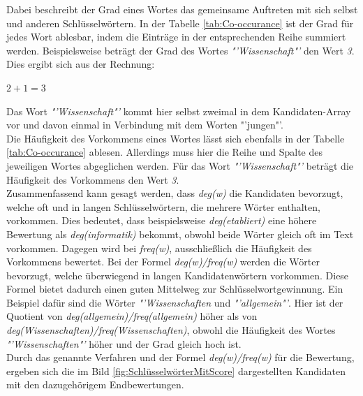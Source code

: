 			Dabei beschreibt der Grad eines Wortes das gemeinsame Auftreten mit sich selbst und anderen Schlüsselwörtern. In der Tabelle \ref{tab:Co-occurance} ist der Grad für jedes Wort ablesbar, indem die Einträge in der entsprechenden Reihe summiert werden. Beispielsweise beträgt der Grad des Wortes \textit{"'Wissenschaft"'} den Wert \textit{3}. Dies ergibt sich aus der Rechnung:
			\begin{center}
				$2 + 1 = 3$
			\end{center}
			Das Wort \textit{"'Wissenschaft"'} kommt hier selbst zweimal in dem Kandidaten-Array vor und davon einmal in Verbindung mit dem Worten "'jungen"'.\\
			Die Häufigkeit des Vorkommens eines Wortes lässt sich ebenfalls in der Tabelle \ref{tab:Co-occurance} ablesen. Allerdings muss hier die Reihe und Spalte des jeweiligen Wortes abgeglichen werden. Für das Wort \textit{"'Wissenschaft"'} beträgt die Häufigkeit des Vorkommens den Wert \textit{3}.\\
			Zusammenfassend kann gesagt werden, dass \textit{deg(w)} die Kandidaten bevorzugt, welche oft und in langen Schlüsselwörtern, die mehrere Wörter enthalten, vorkommen. Dies bedeutet, dass beispielsweise \textit{deg(etabliert)} eine höhere Bewertung als \textit{deg(informatik)} bekommt, obwohl beide Wörter gleich oft im Text vorkommen. Dagegen wird bei \textit{freq(w)}, ausschließlich die Häufigkeit des Vorkommens bewertet. Bei der Formel \textit{deg(w)/freq(w)} werden die Wörter bevorzugt, welche überwiegend in langen Kandidatenwörtern vorkommen. Diese Formel bietet dadurch einen guten Mittelweg zur Schlüsselwortgewinnung. Ein Beispiel dafür sind die Wörter \textit{"'Wissenschaften} und \textit{"'allgemein"'}. Hier ist der Quotient von \textit{deg(allgemein)/freq(allgemein)} höher als von \textit{deg(Wissenschaften)/freq(Wissenschaften)}, obwohl die Häufigkeit des Wortes \textit{"'Wissenschaften"'} höher und der Grad gleich hoch ist. \cite{rose2010automatic}\\
			Durch das genannte Verfahren und der Formel \textit{deg(w)/freq(w)} für die Bewertung, ergeben sich die im Bild \ref{fig:SchlüsselwörterMitScore} dargestellten Kandidaten mit den dazugehörigem Endbewertungen. \cite{rose2010automatic}
			
